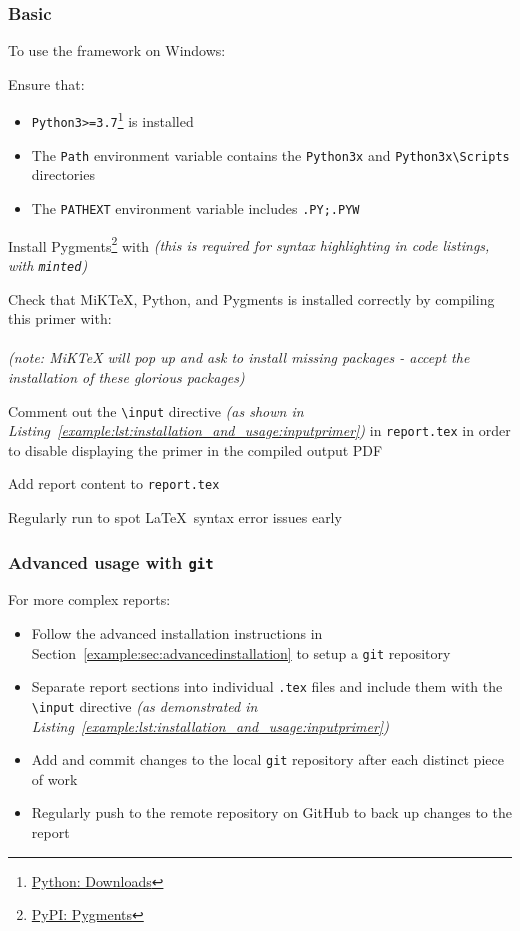 \subsubsection{Basic}
To use the \uswdwmspkg{} framework on Windows:
\begin{methodology0}
  \item Ensure that:
    \begin{itemize}
      \item \texttt{Python3>=3.7}\footnote{\href{https://www.python.org/downloads/}{Python: Downloads}} is installed
      \item The \texttt{Path} environment variable contains the \texttt{Python3x} and \texttt{Python3x\textbackslash Scripts} directories
      \item The \texttt{PATHEXT} environment variable includes \texttt{.PY;.PYW}
    \end{itemize}
  \item Install Pygments\footnote{\href{https://pypi.org/project/Pygments/}{PyPI: Pygments}} with  \textit{(this is required for syntax highlighting in code listings, with \texttt{minted})}
  \item Check that MiKTeX, Python, and Pygments is installed correctly by compiling this primer with:\\
   \\
   \textit{(note: MiKTeX will pop up and ask to install missing packages - accept the installation of these glorious packages)}
  \item Comment out the \texttt{\textbackslash input} directive \textit{(as shown in Listing~\ref{example:lst:installation_and_usage:inputprimer})} in \texttt{report.tex} in order to disable displaying the primer in the compiled output PDF
  \item Add report content to \texttt{report.tex}
  \item Regularly run  to spot \LaTeX\ syntax error issues early
\end{methodology0}

\subsubsection{Advanced usage with \texttt{git}}
For more complex reports:
\begin{itemize}
  \item Follow the advanced installation instructions in Section~\ref{example:sec:advancedinstallation} to setup a \texttt{git} repository
  \item Separate report sections into individual \texttt{.tex} files and include them with the \texttt{\textbackslash input} directive \textit{(as demonstrated in Listing~\ref{example:lst:installation_and_usage:inputprimer})}
  \item Add and commit changes to the local \texttt{git} repository after each distinct piece of work
  \item Regularly push to the remote repository on GitHub to back up changes to the report
\end{itemize}

